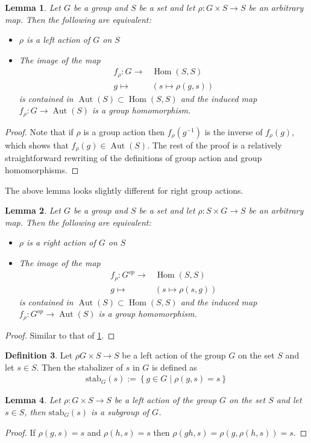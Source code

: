 \documentclass[a4paper,12pt,reqno]{amsart}
\newcommand{\set}[1]{\left\lbrace #1 \right\rbrace}
\newcommand{\stab}[2]{\text{stab}_{#1}(#2)}
\DeclareMathOperator{\Hom}{Hom}
\DeclareMathOperator{\Aut}{Aut}
\newtheorem{lemma}{Lemma}
\theoremstyle{definition}
\newtheorem{definition}[lemma]{Definition}
\numberwithin{lemma}{section}
\numberwithin{equation}{section}
\numberwithin{figure}{section}
\begin{document}
\begin{lemma}\label{lem:left-group-action-is-group-hom}
Let $G$ be a group and $S$ be a set and let $\rho : G \times S \to S$ be an arbitrary map. Then the following are equivalent:
\begin{itemize}
	\item $\rho$ is a left action of $G$ on $S$
	\item The image of the map\begin{align*}
	f_\rho : G \to& \Hom(S,S)\\
	g \mapsto& (s\mapsto \rho(g,s))
	\end{align*} is contained in $\Aut(S) \subset \Hom(S,S)$ and the induced map $f_\rho : G \to \Aut(S)$ is a group homomorphism.
\end{itemize}
\end{lemma}
\begin{proof}
Note that if $\rho$ is a group action then $f_\rho(g^{-1})$ is the inverse of $f_\rho(g)$, which shows that $f_\rho(g) \in \Aut(S)$. The rest of the proof is a relatively straightforward rewriting of the definitions of group action and group homomorphisms.	%
\end{proof}


The above lemma looks slightly different for right group actions.
\begin{lemma}\label{lem:right-group-action-is-oppositie-group-hom}
	Let $G$ be a group and $S$ be a set and let $\rho : S \times G \to S$ be an arbitrary map. Then the following are equivalent:
	\begin{itemize}
		\item $\rho$ is a right action of $G$ on $S$
		\item The image of the map\begin{align*}
		f_\rho : G^{op} \to& \Hom(S,S)\\
		g \mapsto& (s\mapsto \rho(s,g))
		\end{align*} is contained in $\Aut(S) \subset \Hom(S,S)$ and the induced map $f_\rho : G^{op} \to \Aut(S)$ is a group homomorphism.
	\end{itemize}
\end{lemma}
\begin{proof}
	Similar to that of \cref{lem:left-group-action-is-group-hom}.
\end{proof}

\begin{definition}\label{def:stabilizer}
Let $\rho G \times S \to S$ be a left action of the group $G$ on the set $S$ and let $s \in S$. Then the stabalizer of $s$ in  $G$ is defined as \begin{align*}
\stab{G}{s} := \set{ g \in G \mid \rho(g,s)=s}
\end{align*}
\end{definition}
\begin{lemma}
Let $\rho: G \times S \to S$ be a left action of the group $G$ on the set $S$ and let $s \in S$, then $\stab{G}{s}$ is a subgroup of $G$.
\end{lemma}
\begin{proof}
If $\rho(g,s)=s$ and $\rho(h,s)=s$ then $\rho(gh,s)=\rho(g,\rho(h,s))=s$.
\end{proof}
\end{document}

